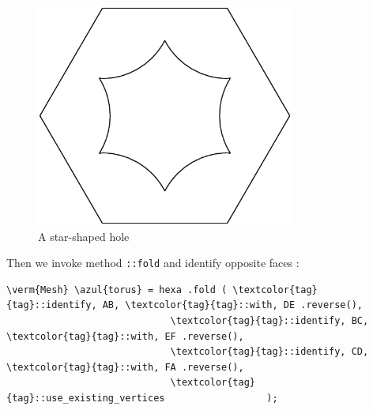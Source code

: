\begin{figure}[ht] \centering
  \includegraphics[width=85mm]{hexagon-bdry.eps}
  \caption{A star-shaped hole}
  \label{\numb section 7.\numb fig 16}
\end{figure}

Then we invoke method {\small\tt{}::fold} and identify opposite faces :

\begin{Verbatim}[commandchars=\\\{\},formatcom=\small\tt,frame=single,
   label=parag-\ref{\numb section 7.\numb parag 21}.cpp,rulecolor=\color{moldura},
   baselinestretch=0.94,framesep=2mm                                             ]
   \verm{Mesh} \azul{torus} = hexa .fold ( \textcolor{tag}{tag}::identify, AB, \textcolor{tag}{tag}::with, DE .reverse(),
                             \textcolor{tag}{tag}::identify, BC, \textcolor{tag}{tag}::with, EF .reverse(),
                             \textcolor{tag}{tag}::identify, CD, \textcolor{tag}{tag}::with, FA .reverse(),
                             \textcolor{tag}{tag}::use_existing_vertices                  );
\end{Verbatim}


